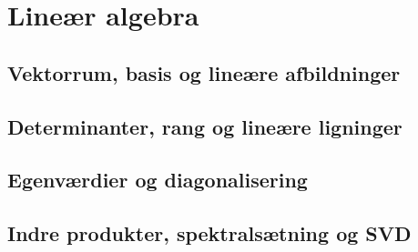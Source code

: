 \chapter{Lineær algebra}
\section{Vektorrum, basis og lineære afbildninger}
\leavevmode\par

\section{Determinanter, rang og lineære ligninger}
\leavevmode\par

\section{Egenværdier og diagonalisering}
\leavevmode\par

\section{Indre produkter, spektralsætning og SVD}
\leavevmode\par
